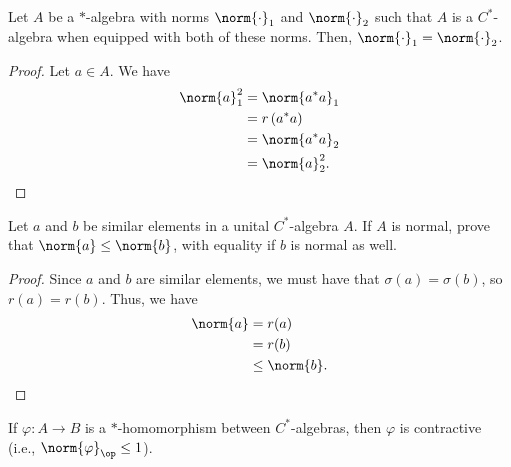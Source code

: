 \documentclass[10pt]{mypackage}
\begin{document}
\begin{proposition}
  Let $A$ be a $\ast$-algebra with norms $\norm{\cdot}_1$ and $\norm{\cdot}_2$ such that $A$ is a $C^{\ast}$-algebra when equipped with both of these norms. Then, $\norm{\cdot}_1 = \norm{\cdot}_2$.
\end{proposition}
\begin{proof}
  Let $a\in A$. We have
  \begin{align*}
    \norm{a}_1^2 &= \norm{a^{\ast}a}_{1}\\
                 &= r\left(a^{\ast}a\right)\\
                 &= \norm{a^{\ast}a}_2\\
                 &= \norm{a}_2^2.
  \end{align*}
\end{proof}
\begin{exercise}
  Let $a$ and $b$ be similar elements in a unital $C^{\ast}$-algebra $A$. If $A$ is normal, prove that $\norm{a}\leq \norm{b}$, with equality if $b$ is normal as well.
\end{exercise}
\begin{proof}
  Since $a$ and $b$ are similar elements, we must have that $\sigma\left(a\right) = \sigma\left(b\right)$, so $r(a) = r(b)$. Thus, we have
  \begin{align*}
    \norm{a} &= r(a)\\
             &= r(b)\\
             &\leq \norm{b}.
  \end{align*}
\end{proof}
\begin{proposition}
  If $\varphi\colon A\rightarrow B$ is a $\ast$-homomorphism between $C^{\ast}$-algebras, then $\varphi$ is contractive (i.e., $\norm{\varphi}_{\op} \leq 1$).
\end{proposition}
\end{document}
